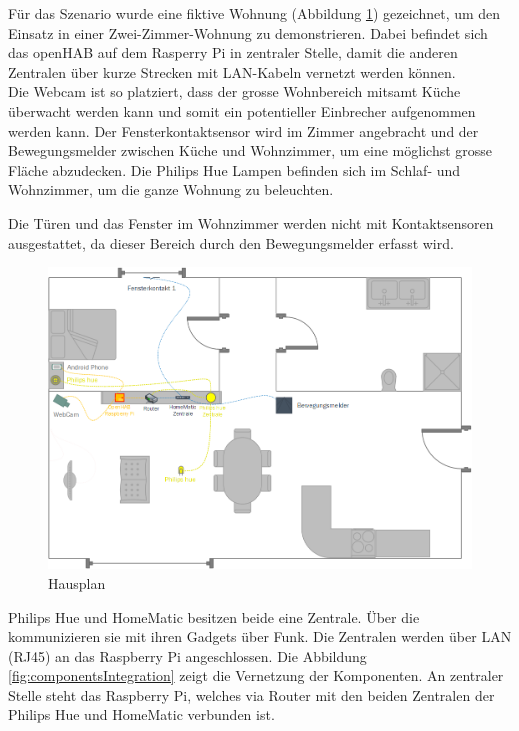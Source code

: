 Für das Szenario wurde eine fiktive Wohnung (Abbildung \ref{fig:housePlan}) gezeichnet, um den Einsatz in einer Zwei-Zimmer-Wohnung zu demonstrieren. Dabei befindet sich das openHAB auf dem Rasperry Pi in zentraler Stelle, damit die anderen Zentralen über kurze Strecken mit LAN-Kabeln vernetzt werden können.\\
Die Webcam ist so platziert, dass der grosse Wohnbereich mitsamt Küche überwacht werden kann und somit ein potentieller Einbrecher aufgenommen werden kann. Der Fensterkontaktsensor wird im Zimmer angebracht und der Bewegungsmelder zwischen Küche und Wohnzimmer, um eine möglichst grosse Fläche abzudecken. Die Philips Hue Lampen befinden sich im Schlaf- und Wohnzimmer, um die ganze Wohnung zu beleuchten.

Die Türen und das Fenster im Wohnzimmer werden nicht mit Kontaktsensoren ausgestattet, da dieser Bereich durch den Bewegungsmelder erfasst wird.

\begin{figure}[H]
	\centering
		\includegraphics[scale=0.55]{report/img/hausplan_aktuell}
	\caption{Hausplan}
	\label{fig:housePlan}
\end{figure}

Philips Hue und HomeMatic besitzen beide eine Zentrale. Über die kommunizieren sie mit ihren Gadgets über Funk. Die Zentralen werden über LAN (RJ45) an das Raspberry Pi angeschlossen. Die Abbildung \ref{fig:componentsIntegration} zeigt die Vernetzung der Komponenten. An zentraler Stelle steht das Raspberry Pi, welches via Router mit den beiden Zentralen der Philips Hue und HomeMatic verbunden ist.

